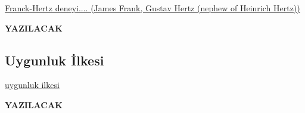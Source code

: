\documentclass[a4paper,12pt, twoside]{article}
\newcommand{\YAZILACAK}{{\vspace{18pt}\bf\Large \color{red} YAZILACAK}}
\begin{document}
\vspace{12pt}

\href{http://hyperphysics.phy-astr.gsu.edu/hbase/FrHz.html}{Franck-Hertz deneyi.... (James Frank, Gustav Hertz (nephew of Heinrich Hertz))}

\YAZILACAK

\subsection{Uygunluk İlkesi}
\href{http://hyperphysics.phy-astr.gsu.edu/hbase/quantum/hosc6.html}{uygunluk ilkesi}

\YAZILACAK






\newpage
\renewcommand\refname{Kaynaklar}
{}
 
 
\end{document}
